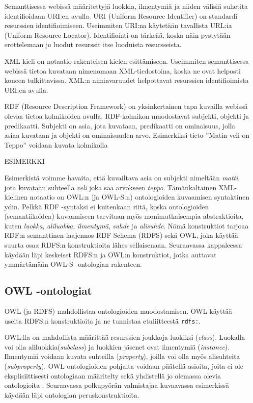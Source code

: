 \documentclass[finnish]{tktltiki2}
\theoremstyle{definition}
\theoremstyle{remark}
\begin{document}
Semanttisessa webissä määritettyjä luokkia, ilmentymiä ja niiden välisiä suhetita identifioidaan URI:en avulla\cite{semweb}.
URI (Uniform Resource Identifier) on standardi resurssien identifioimiseen. Useimmiten URI:na käytetään tavallista URL:ia (Uniform Resource Locator). Identifiointi on tärkeää, koska näin pystytään erottelemaan jo luodut resurssit itse luoduista resursseista\cite{semweb}. 

XML-kieli on notaatio rakenteisen kielen esittämiseen. Useimmiten semanttisessa webissä tietoa kuvataan nimenomaan XML-tiedostoina, koska ne ovat helposti koneen tulkittavissa. XML:n nimiavaruudet helpottavat resurssien identifioimista URI:en avulla. 

RDF (Resource Description Framework) on yksinkertainen tapa kuvailla webissä olevaa tietoa kolmikoiden avulla\cite{RDFP}. RDF-kolmikon muodostavat subjekti, objekti ja predikaatti\cite{RDFP}. Subjekti on asia, jota kuvataan, predikaatti on ominaisuus, jolla asiaa kuvataan ja objekti on ominaisuuden arvo. Esimerkiksi tieto ''Matin veli on Teppo'' voidaan kuvata kolmikolla 


ESIMERKKI


Esimerkistä voimme havaita, että kuvailtava asia on subjekti nimeltään \textit{matti}, jota kuvataan suhteella \textit{veli} joka saa arvokseen \textit{teppo}. Tämänkaltainen XML-kielinen notaatio on OWL:n (ja OWL-S:n) ontologioiden kuvaamisen syntaktinen ydin. Pelkkä RDF -syntaksi ei kuitenkaan riitä, koska ontologioiden (semantiikoiden) kuvaamiseen tarvitaan myös monimutkaisempia abstraktioita, kuten \textit{luokka}, \textit{aliluokka}, \textit{ilmentymä}, \textit{suhde} ja \textit{alisuhde}. Nämä konstruktiot tarjoaa RDF:n semanttinen laajennos RDF Schema (RDFS) sekä OWL, joka käyttää suurta osaa RDFS:n konstruktioita lähes sellaisenaan.  Seuraavassa kappaleessa käydään läpi keskeiset RDFS:n ja OWL:n konstruktiot, jotka auttavat ymmärtämään OWL-S -ontologian rakenteen.

\subsection{OWL -ontologiat}

OWL (ja RDFS) mahdollistaa ontologioiden muodostamisen.
OWL käyttää useita RDFS:n konstruktioita ja ne tunnistaa etuliitteestä \texttt{rdfs:}.

OWL:lla on mahdollista määrittää resurssien joukkoja luokiksi (\textit{class}). Luokalla voi olla aliluokkia(\textit{subclass}) ja luokkien jäsenet ovat ilmentymiä (\textit{instance}). Ilmentymiä voidaan kuvata suhteilla (\textit{property}), joilla voi olla myös alisuhteita (\textit{subproperty})\cite{owlguide}. OWL-ontologioiden pohjalta voidaan päätellä asioita, joita ei ole eksplisiittisesti ontologiaan määritelty sekä yhdistellä jo olemassa olevia ontologioita \cite{owlguide}. Seuraavassa polkupyörän valmistajaa kuvaavassa esimerkissä käydään läpi ontologian peruskonstruktioita. 
\end{document}

